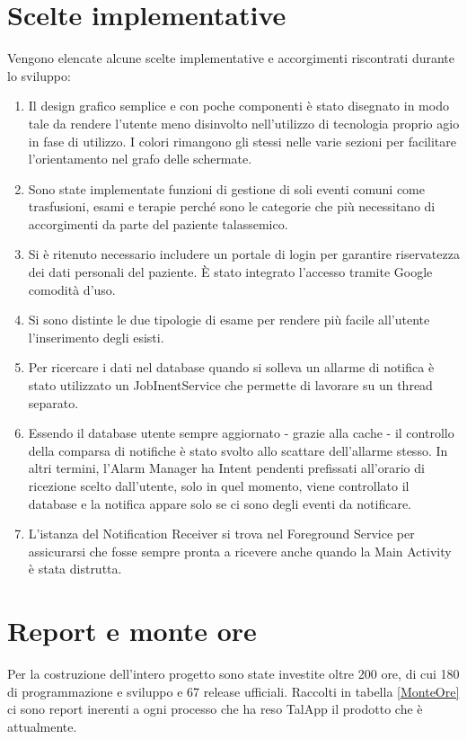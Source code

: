 \documentclass[12pt,a4paper,openright,twoside]{report}
\begin{document}
\section{Scelte implementative}
Vengono elencate alcune scelte implementative e accorgimenti riscontrati durante lo sviluppo:

\begin{enumerate}
    \item Il design grafico semplice e con poche componenti è stato disegnato in modo tale da rendere l'utente meno disinvolto nell'utilizzo di tecnologia proprio agio in fase di utilizzo. I colori rimangono gli stessi nelle varie sezioni per facilitare l'orientamento nel grafo delle schermate.
    \item Sono state implementate funzioni di gestione di soli eventi comuni come trasfusioni, esami e terapie perché sono le categorie che più necessitano di accorgimenti da parte del paziente talassemico.
    \item Si \`e ritenuto necessario includere un portale di login per garantire riservatezza dei dati personali del paziente. \`E stato integrato l'accesso tramite Google comodità d'uso.
    \item Si sono distinte le due tipologie di esame per rendere più facile all'utente l'inserimento degli esisti.
    \item Per ricercare i dati nel database quando si solleva un allarme di notifica è stato utilizzato un JobInentService che permette di lavorare su un thread separato.
    \item Essendo il database utente sempre aggiornato - grazie alla cache - il controllo della comparsa di notifiche è stato svolto allo scattare dell'allarme stesso. In altri termini, l'Alarm Manager ha Intent pendenti prefissati all'orario di ricezione scelto dall'utente, solo in quel momento, viene controllato il database e la notifica appare solo se ci sono degli eventi da notificare.
    \item L'istanza del Notification Receiver si trova nel Foreground Service per assicurarsi che fosse sempre pronta a ricevere anche quando la Main Activity è stata distrutta.
\end{enumerate}

\section{Report e monte ore}
Per la costruzione dell'intero progetto sono state investite oltre 200 ore, di cui 180 di programmazione e sviluppo e 67 release ufficiali. Raccolti in tabella \ref{MonteOre}  ci sono report inerenti a ogni processo che ha reso TalApp il prodotto che è attualmente.
\end{document}
